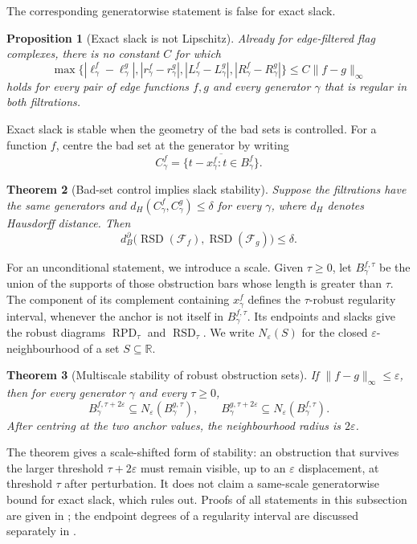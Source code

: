 \documentclass[11pt,letterpaper]{article}
\newtheorem{theorem}{Theorem}[section]
\newtheorem{proposition}[theorem]{Proposition}
\theoremstyle{definition}
\newcommand{\RPD}{\operatorname{RPD}}
\newcommand{\RSD}{\operatorname{RSD}}
\newcommand{\eps}{\varepsilon}
\begin{document}
The corresponding generatorwise statement is false for exact slack.

\begin{proposition}[Exact slack is not Lipschitz]
\label{prop:no-go}
Already for edge-filtered flag complexes, there is no constant $C$ for which
$$
\max\{|\ell_\gamma^f-\ell_\gamma^g|,
       |r_\gamma^f-r_\gamma^g|,
       |L_\gamma^f-L_\gamma^g|,
       |R_\gamma^f-R_\gamma^g|\}
\leq C\|f-g\|_\infty
$$
holds for every pair of edge functions $f,g$ and every generator $\gamma$
that is regular in both filtrations.
\end{proposition}

Exact slack is stable when the geometry of the bad sets is controlled. For a
function $f$, centre the bad set at the generator by writing
$$
C_\gamma^f
=\overline{\{t-x_\gamma^f:t\in B_\gamma^f\}}.
$$

\begin{theorem}[Bad-set control implies slack stability]
\label{thm:badset-slack-stability}
Suppose the filtrations have the same generators and
$d_H(C_\gamma^f,C_\gamma^g)\leq\delta$ for every $\gamma$, where $d_H$
denotes Hausdorff distance. Then
$$
d_B^\partial\bigl(\RSD(\mathcal F_f),\RSD(\mathcal F_g)\bigr)
\leq\delta.
$$
\end{theorem}

For an unconditional statement, we introduce a scale. Given $\tau\geq0$, let
$B_\gamma^{f,\tau}$ be the union of the supports of those obstruction bars
whose length is greater than $\tau$. The component of its complement
containing $x_\gamma^f$ defines the $\tau$-robust regularity interval, whenever
the anchor is not itself in $B_\gamma^{f,\tau}$. Its endpoints and slacks give
the robust diagrams $\RPD_\tau$ and $\RSD_\tau$. We write $N_\eps(S)$ for the
closed $\eps$-neighbourhood of a set $S\subseteq\mathbb R$.

\begin{theorem}[Multiscale stability of robust obstruction sets]
\label{thm:robust-badset-stability}
If $\|f-g\|_\infty\leq\eps$, then for every generator $\gamma$ and every
$\tau\geq0$,
$$
B_\gamma^{f,\tau+2\eps}
\subseteq N_\eps(B_\gamma^{g,\tau}),
\qquad
B_\gamma^{g,\tau+2\eps}
\subseteq N_\eps(B_\gamma^{f,\tau}).
$$
After centring at the two anchor values, the neighbourhood radius is
$2\eps$.
\end{theorem}

The theorem gives a scale-shifted form of stability: an obstruction that
survives the larger threshold $\tau+2\eps$ must remain visible, up to an
$\eps$ displacement, at threshold $\tau$ after perturbation. It does not
claim a same-scale generatorwise bound for exact slack, which
 rules out. Proofs of all statements in this subsection are
given in ; the endpoint degrees of a regularity
interval are discussed separately in .
\end{document}
